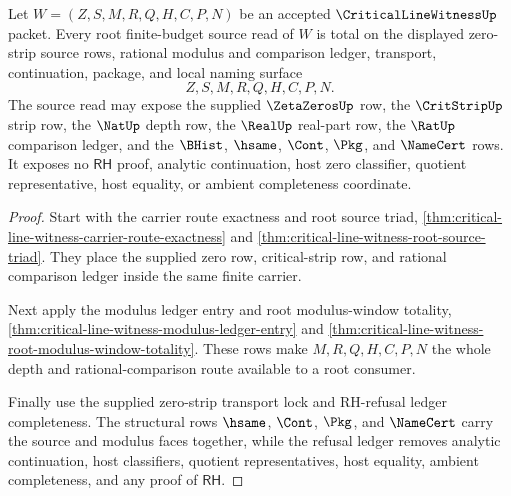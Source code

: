 \begin{theorem}
\label{thm:critical-line-witness-root-finite-budget-source-totality}
Let $W=(Z,S,M,R,Q,H,C,P,N)$ be an accepted $\CriticalLineWitnessUp$ packet.
Every root finite-budget source read of $W$ is total on the displayed zero-strip
source rows, rational modulus and comparison ledger, transport, continuation,
package, and local naming surface
$$
Z,S,M,R,Q,H,C,P,N.
$$
The source read may expose the supplied $\ZetaZerosUp$ row, the
$\CritStripUp$ strip row, the $\NatUp$ depth row, the $\RealUp$ real-part row,
the $\RatUp$ comparison ledger, and the $\BHist$, $\hsame$, $\Cont$, $\Pkg$,
and $\NameCert$ rows. It exposes no $\mathsf{RH}$ proof, analytic continuation,
host zero classifier, quotient representative, host equality, or ambient
completeness coordinate.
\end{theorem}
\begin{proof}
Start with the carrier route exactness and root source triad,
\autoref{thm:critical-line-witness-carrier-route-exactness} and
\autoref{thm:critical-line-witness-root-source-triad}. They place the supplied
zero row, critical-strip row, and rational comparison ledger inside the same
finite carrier.

Next apply the modulus ledger entry and root modulus-window totality,
\autoref{thm:critical-line-witness-modulus-ledger-entry} and
\autoref{thm:critical-line-witness-root-modulus-window-totality}. These rows
make $M,R,Q,H,C,P,N$ the whole depth and rational-comparison route available to
a root consumer.

Finally use the supplied zero-strip transport lock and RH-refusal ledger
completeness. The structural rows $\hsame$, $\Cont$, $\Pkg$, and $\NameCert$
carry the source and modulus faces together, while the refusal ledger removes
analytic continuation, host classifiers, quotient representatives, host
equality, ambient completeness, and any proof of $\mathsf{RH}$.
\end{proof}

